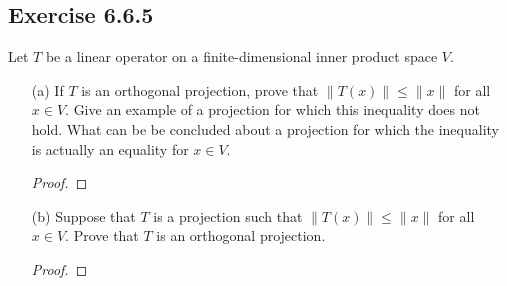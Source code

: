 \subsection*{Exercise 6.6.5} Let \( T  \) be a linear operator on a finite-dimensional inner product space \( V  \).
\begin{enumerate}
    \item[(a)] If \( T  \) is an orthogonal projection, prove that \( \|T(x)\| \leq \|x\| \) for all \( x \in V  \). Give an example of a projection for which this inequality does not hold. What can be be concluded about a projection for which the inequality is actually an equality for \( x \in V  \).
        \begin{proof}
        
        \end{proof}
    \item[(b)] Suppose that \( T  \) is a projection such that \( \|T(x)\| \leq \|x\| \) for all \( x \in V  \). Prove that \( T  \) is an orthogonal projection.
        \begin{proof}
        
        \end{proof}
\end{enumerate}

